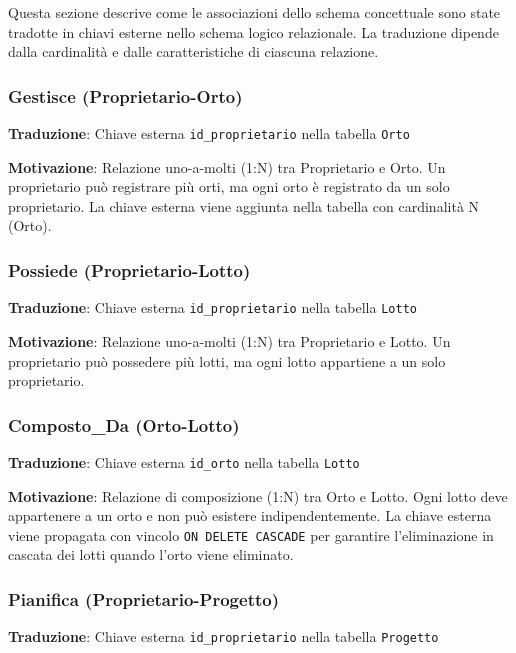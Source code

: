 \documentclass[12pt,a4paper]{article}
\begin{document}
Questa sezione descrive come le associazioni dello schema concettuale sono state tradotte in chiavi esterne nello schema logico relazionale. La traduzione dipende dalla cardinalità e dalle caratteristiche di ciascuna relazione.

\subsubsection{Gestisce (Proprietario-Orto)}

\textbf{Traduzione}: Chiave esterna \texttt{id\_proprietario} nella tabella \texttt{Orto}

\textbf{Motivazione}: Relazione uno-a-molti (1:N) tra Proprietario e Orto. Un proprietario può registrare più orti, ma ogni orto è registrato da un solo proprietario. La chiave esterna viene aggiunta nella tabella con cardinalità N (Orto).

\subsubsection{Possiede (Proprietario-Lotto)}

\textbf{Traduzione}: Chiave esterna \texttt{id\_proprietario} nella tabella \texttt{Lotto}

\textbf{Motivazione}: Relazione uno-a-molti (1:N) tra Proprietario e Lotto. Un proprietario può possedere più lotti, ma ogni lotto appartiene a un solo proprietario.

\subsubsection{Composto\_Da (Orto-Lotto)}

\textbf{Traduzione}: Chiave esterna \texttt{id\_orto} nella tabella \texttt{Lotto}

\textbf{Motivazione}: Relazione di composizione (1:N) tra Orto e Lotto. Ogni lotto deve appartenere a un orto e non può esistere indipendentemente. La chiave esterna viene propagata con vincolo \texttt{ON DELETE CASCADE} per garantire l'eliminazione in cascata dei lotti quando l'orto viene eliminato.

\subsubsection{Pianifica (Proprietario-Progetto)}

\textbf{Traduzione}: Chiave esterna \texttt{id\_proprietario} nella tabella \texttt{Progetto}
\end{document}

